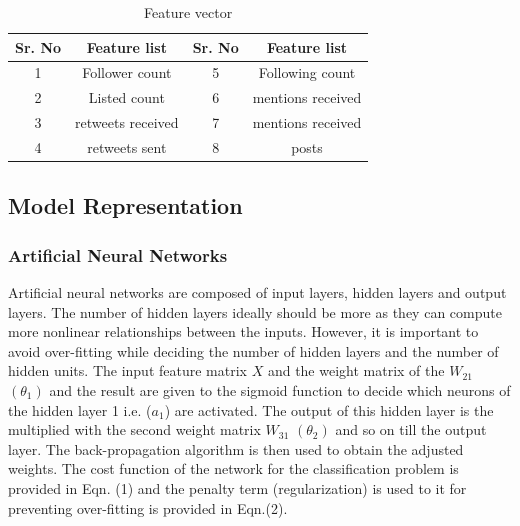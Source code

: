 \begin{table}[!h]
\renewcommand{\arraystretch}{1.3}
\caption{Feature vector}
\label{table}
\centering
\begin{tabular}{|c|c|c|c|}
  \hline
\multicolumn{1}{|c|}{\textbf{Sr. No}} & \multicolumn{1}{c|}{\textbf{Feature list}} & \multicolumn{1}{c|}{\textbf{Sr. No}} & \multicolumn{1}{c|}{\textbf{Feature list}}\\
  \hline
  1 & Follower count & 5 & Following count\\
  \hline
  2 & Listed count & 6 & mentions received\\
  \hline
  3 & retweets received & 7 & mentions received\\
  \hline
  4 &  retweets sent & 8 & posts\\
  \hline
\end{tabular}
\end{table}

\subsection{Model Representation}

\subsubsection{Artificial Neural Networks}
Artificial neural networks are composed of input layers, hidden layers and output layers. The number of hidden layers ideally should be more as they can compute more nonlinear relationships between the inputs. However, it is important to avoid over-fitting while deciding the number of hidden layers and the number of hidden units. The input feature matrix $X$ and the weight matrix of the $W_{21}$ $(\theta_{1})$ and the result are given to the sigmoid function to decide which neurons of the hidden layer 1 i.e. ($a_{1}$) are activated. The output of this hidden layer is the multiplied with the second weight matrix $W_{31}$ $(\theta_{2})$ and so on till the output layer. The back-propagation algorithm is then used to obtain the adjusted weights. The cost function of the network for the classification problem is provided in Eqn. (1) and the penalty term (regularization) is used to it for preventing over-fitting is provided in Eqn.(2).\\


